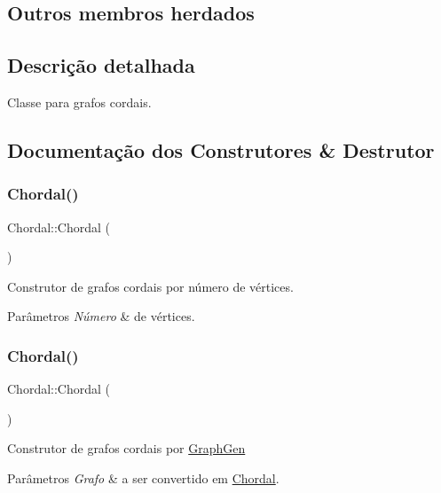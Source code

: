 \subsection*{Outros membros herdados}


\subsection{Descrição detalhada}
Classe para grafos cordais. 

\subsection{Documentação dos Construtores \& Destrutor}
\mbox{\label{classChordal_af315e26462665f1881975cc27372a67a}} 
\subsubsection{\texorpdfstring{Chordal()}{Chordal()}\hspace{0.1cm}{\footnotesize\ttfamily [1/2]}}
{\footnotesize\ttfamily Chordal\+::\+Chordal (\begin{DoxyParamCaption}\item[{int}]{ }\end{DoxyParamCaption})}

Construtor de grafos cordais por número de vértices. 
\begin{DoxyParams}{Parâmetros}
{\em Número} & de vértices. \\
\hline
\end{DoxyParams}
\mbox{\label{classChordal_a6ab51b523f1b150560fcae74db9eee68}} 
\subsubsection{\texorpdfstring{Chordal()}{Chordal()}\hspace{0.1cm}{\footnotesize\ttfamily [2/2]}}
{\footnotesize\ttfamily Chordal\+::\+Chordal (\begin{DoxyParamCaption}\item[{\hyperlink{classGraphGen}{Graph\+Gen} \&}]{ }\end{DoxyParamCaption})}

Construtor de grafos cordais por \hyperlink{classGraphGen}{Graph\+Gen} 
\begin{DoxyParams}{Parâmetros}
{\em Grafo} & a ser convertido em \hyperlink{classChordal}{Chordal}. \\
\hline
\end{DoxyParams}


